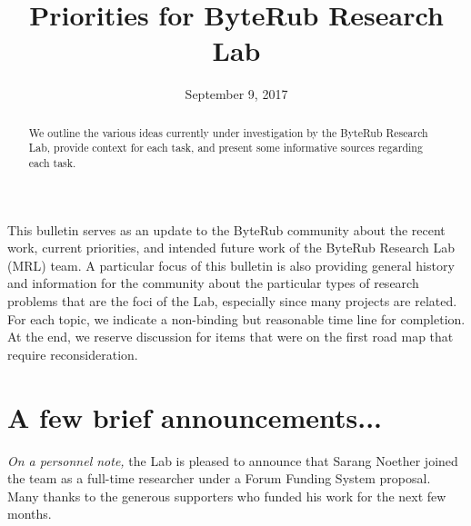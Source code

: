 \documentclass[12pt,english]{mrl}
\theoremstyle{definition}
\numberwithin{equation}{section}
\numberwithin{figure}{section}
\numberwithin{equation}{section}
\numberwithin{equation}{section}
\numberwithin{figure}{section}
\begin{document}
\begin{frontmatter}

\begin{fmbox}
\hfill\setlength{\fboxrule}{0px}\setlength{\fboxsep}{5px}
\title{Priorities for ByteRub Research Lab}
\date{September 9, 2017}
\author[
   addressref={mrl},
   email={bggoode@g.clemson.edu}
]{ }
\author[
   addressref={mrl},
   email={sarang.noether@protonmail.com}
]{ }


\address[id=mrl]{
}
\end{fmbox}

\begin{abstractbox}
\begin{abstract}
We outline the various ideas currently under investigation by the ByteRub Research Lab, provide context for each task, and present some informative sources regarding each task. \end{abstract}
\end{abstractbox}
\end{frontmatter}


This bulletin serves as an update to the ByteRub community about the recent work, current priorities, and intended future work of the ByteRub Research Lab (MRL) team. A particular focus of this bulletin is also providing general history and information for the community about the particular types of research problems that are the foci of the Lab, especially since many projects are related. For each topic, we indicate a non-binding but reasonable time line for completion. At the end, we reserve discussion for items that were on the first road map that require reconsideration.

\section{A few brief announcements...}

\textit{On a personnel note,} the Lab is pleased to announce that Sarang Noether joined the team as a full-time researcher under a Forum Funding System proposal. Many thanks to the generous supporters who funded his work for the next few months.
\end{document}
